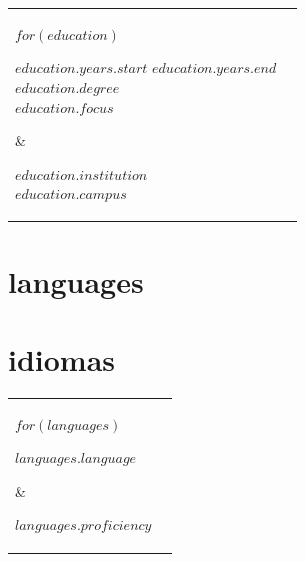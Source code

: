 \documentclass[letterpaper,11pt]{article}
\newcommand{\lightfont}[1]{{%
    {\hlight\color{light-gray}#1}
  }}
\newcommand{\pubstyle}[1]{{%
    {\fontsize{10pt}{13pt}\hlight\color{light-gray}#1}
  }}
\newcommand{\lightbf}[1]{{%
    \textbf{\lightfont{#1}}
  }}
\newcommand{\emphasized}[1]{{%
    {\fontsize{12pt}{14pt}\textbf{#1}}
  }}
\begin{document}
\begin{minipage}[t]{0.64\textwidth}
\begin{tabular}{@{}p{\hwide}p{\rightwide}}
    $for(education)$
      \parbox[t][][t]{\hwide}{%
        \lightfont{$education.years.start$ \textendash{} $education.years.end$} \\
        \smallskip
        \emphasized{$education.degree$} \\
        \smallskip
        \emphasized{$education.focus$} \\
      } & %
      \parbox[t][][t]{\rightwide}{%
        \lightfont{\textbf{$education.institution$} \\
          \emph{$education.campus$}} \\ %
        \medskip %
      } \\
    $endfor$
  \end{tabular}
  \vspace{-0.8em}

      {\section{languages}}
      {\section{idiomas}}%
  \setlength{\parskip}{1mm}
  \setlength{\hwide}{\dimexpr.5\hsize-4\tabcolsep}
  \setlength{\hwideright}{\dimexpr\hwide+5\tabcolsep}

  \begin{tabular}{@{}p{\hwide}p{\rightwide}}
    $for(languages)$
      \parbox[t][][t]{\hwide}{%
        \emphasized{$languages.language$}
        \medskip
      } & %
      \parbox[t][][t]{\rightwide}{%
        \lightbf{$languages.proficiency$}
        \medskip
      } \\ %
    $endfor$
  \end{tabular}
%
%  
%  
\end{minipage}
\end{document}
